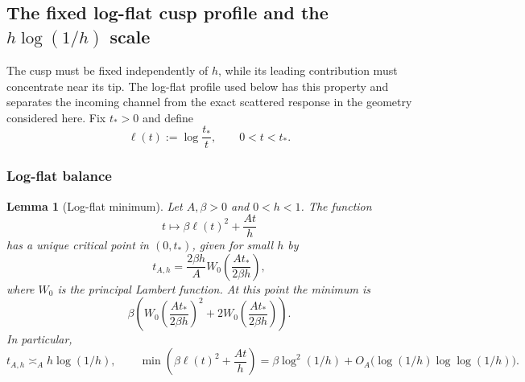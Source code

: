 \documentclass[11pt]{article}
\newtheorem{lemma}[theorem]{Lemma}
\begin{document}
\subsection{The fixed log-flat cusp profile and the
\texorpdfstring{$h\log(1/h)$}{h log(1/h)} scale}\label{ssec:construction}

The cusp must be fixed independently of $h$, while its leading contribution
must concentrate near its tip.  The log-flat profile used below has this
property and separates the incoming channel from the exact scattered
response in the geometry considered here.
Fix $t_*>0$ and define
\begin{equation}\label{eq:log-flat-function}
 \ell(t):=\log\frac{t_*}{t},
 \qquad 0<t<t_*.
\end{equation}

\subsubsection{Log-flat balance}

\begin{lemma}[Log-flat minimum]\label{lem:flat-min}
Let $A,\beta>0$ and $0<h<1$.  The function
\[
 t\longmapsto \beta\ell(t)^2+\frac{At}{h}
\]
has a unique critical point in $(0,t_*)$, given for small $h$ by
\begin{equation}\label{eq:log-flat-saddle-real}
 t_{A,h}=\frac{2\beta h}{A}
 W_0\!\left(\frac{At_*}{2\beta h}\right),
\end{equation}
where $W_0$ is the principal Lambert function.  At this point the minimum is
\begin{equation}\label{eq:log-flat-minimum}
 \beta\left(W_0\!\left(\frac{At_*}{2\beta h}\right)^2
 +2W_0\!\left(\frac{At_*}{2\beta h}\right)\right).
\end{equation}
In particular,
\begin{equation}\label{eq:log-flat-scale}
 t_{A,h}\asymp_A h\log(1/h),
 \qquad
 \min\left(\beta\ell(t)^2+\frac{At}{h}\right)
 =\beta\log^2(1/h)+O_A\bigl(\log(1/h)\log\log(1/h)\bigr).
\end{equation}
\end{lemma}
\end{document}
